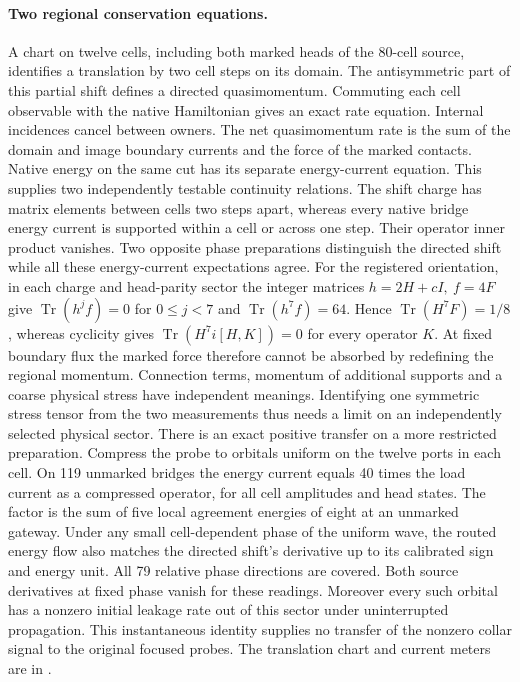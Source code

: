 \documentclass[11pt]{article}
\begin{document}
\paragraph{Two regional conservation equations.}
A chart on twelve cells, including both marked heads of the 80-cell
source, identifies a translation by two cell steps on its domain.
The antisymmetric part of this partial shift defines a directed
quasimomentum. Commuting each cell observable with the native
Hamiltonian gives an exact rate equation. Internal incidences cancel
between owners. The net quasimomentum rate is the sum of the domain
and image boundary currents and the force of the marked contacts.
Native energy on the same cut has its separate energy-current equation.
This supplies two independently testable continuity relations.
The shift charge has matrix elements between cells two steps apart,
whereas every native bridge energy current is supported within a cell
or across one step. Their operator inner product vanishes.
Two opposite phase preparations distinguish the directed shift
while all these energy-current expectations agree. For the registered
orientation, in each charge and head-parity sector the integer matrices
\(h=2H+cI,\ f=4F\) give
\(\operatorname{Tr}(h^j f)=0\) for \(0\le j<7\) and
\(\operatorname{Tr}(h^7 f)=64\). Hence
\(\operatorname{Tr}(H^7F)=1/8\), whereas cyclicity gives
\(\operatorname{Tr}(H^7 i[H,K])=0\) for every operator \(K\).
At fixed boundary flux the marked force therefore cannot be absorbed
by redefining the regional momentum. Connection terms, momentum of
additional supports and a coarse physical stress have independent
meanings. Identifying one
symmetric stress tensor from the two measurements thus needs a limit
on an independently selected physical sector. There is an exact positive transfer on a more restricted
preparation. Compress the probe to orbitals uniform on the twelve
ports in each cell. On 119 unmarked bridges the energy current equals
40 times the load current as a compressed operator, for all cell
amplitudes and head states. The factor is the sum of five local
agreement energies of eight at an unmarked gateway. Under any small
cell-dependent phase of the uniform wave, the routed energy flow also
matches the directed shift's derivative up to its calibrated sign and
energy unit. All 79 relative phase directions are covered.
Both source derivatives at fixed phase vanish for these readings.
Moreover every such orbital has a nonzero initial leakage rate out of
this sector under uninterrupted propagation. This instantaneous
identity supplies no transfer of the nonzero collar signal to the
original focused probes. The translation chart
and current meters are in
.
\end{document}
